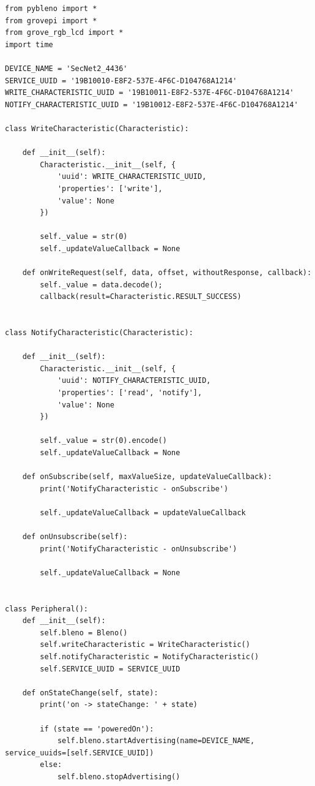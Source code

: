 \documentclass[dvipdfmx,autodetect-engine,titlepage]{jsarticle}
\begin{document}
  \begin{lstlisting}[caption=7-1.py,label=python]
from pybleno import *
from grovepi import *
from grove_rgb_lcd import *
import time

DEVICE_NAME = 'SecNet2_4436'
SERVICE_UUID = '19B10010-E8F2-537E-4F6C-D104768A1214'
WRITE_CHARACTERISTIC_UUID = '19B10011-E8F2-537E-4F6C-D104768A1214'
NOTIFY_CHARACTERISTIC_UUID = '19B10012-E8F2-537E-4F6C-D104768A1214'

class WriteCharacteristic(Characteristic):

    def __init__(self):
        Characteristic.__init__(self, {
            'uuid': WRITE_CHARACTERISTIC_UUID,
            'properties': ['write'],
            'value': None
        })

        self._value = str(0)
        self._updateValueCallback = None

    def onWriteRequest(self, data, offset, withoutResponse, callback):
        self._value = data.decode();
        callback(result=Characteristic.RESULT_SUCCESS)
       
        
class NotifyCharacteristic(Characteristic):

    def __init__(self):
        Characteristic.__init__(self, {
            'uuid': NOTIFY_CHARACTERISTIC_UUID,
            'properties': ['read', 'notify'],
            'value': None
        })

        self._value = str(0).encode()
        self._updateValueCallback = None

    def onSubscribe(self, maxValueSize, updateValueCallback):
        print('NotifyCharacteristic - onSubscribe')

        self._updateValueCallback = updateValueCallback

    def onUnsubscribe(self):
        print('NotifyCharacteristic - onUnsubscribe')

        self._updateValueCallback = None
        
        
class Peripheral():
    def __init__(self):
        self.bleno = Bleno()
        self.writeCharacteristic = WriteCharacteristic()
        self.notifyCharacteristic = NotifyCharacteristic()
        self.SERVICE_UUID = SERVICE_UUID

    def onStateChange(self, state):
        print('on -> stateChange: ' + state)

        if (state == 'poweredOn'):
            self.bleno.startAdvertising(name=DEVICE_NAME, service_uuids=[self.SERVICE_UUID])
        else:
            self.bleno.stopAdvertising()


\end{lstlisting}
\end{document}
